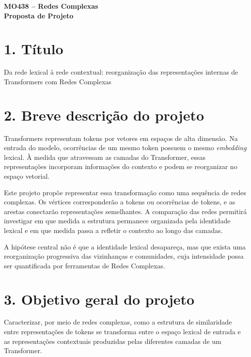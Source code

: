 \documentclass[11pt,a4paper]{article}
\begin{document}
\begin{center}
    {\large\bfseries MO438 -- Redes Complexas}\\[2pt]
    \textbf{Proposta de Projeto}
\end{center}

\vspace{-2mm}

\section*{1. Título}

Da rede lexical à rede contextual: reorganização das representações
internas de Transformers com Redes Complexas

\section*{2. Breve descrição do projeto}

Transformers representam tokens por vetores em espaços de alta dimensão. Na
entrada do modelo, ocorrências de um mesmo token possuem o mesmo
\textit{embedding} lexical. À medida que atravessam as camadas do Transformer,
essas representações incorporam informações do contexto e podem se reorganizar
no espaço vetorial.

Este projeto propõe representar essa transformação como uma sequência de
redes complexas. Os vértices corresponderão a tokens ou ocorrências de
tokens, e as arestas conectarão representações semelhantes. A comparação das
redes permitirá investigar em que medida a estrutura permanece organizada pela
identidade lexical e em que medida passa a refletir o
contexto ao longo das camadas.

A hipótese central não é que a identidade lexical desapareça, mas que exista
uma reorganização progressiva das vizinhanças e comunidades, cuja intensidade
possa ser quantificada por ferramentas de Redes Complexas.

\section*{3. Objetivo geral do projeto}

Caracterizar, por meio de redes complexas, como a estrutura de
similaridade entre representações de tokens se transforma entre o espaço
lexical de entrada e as representações contextuais produzidas pelas diferentes
camadas de um Transformer.
\end{document}
